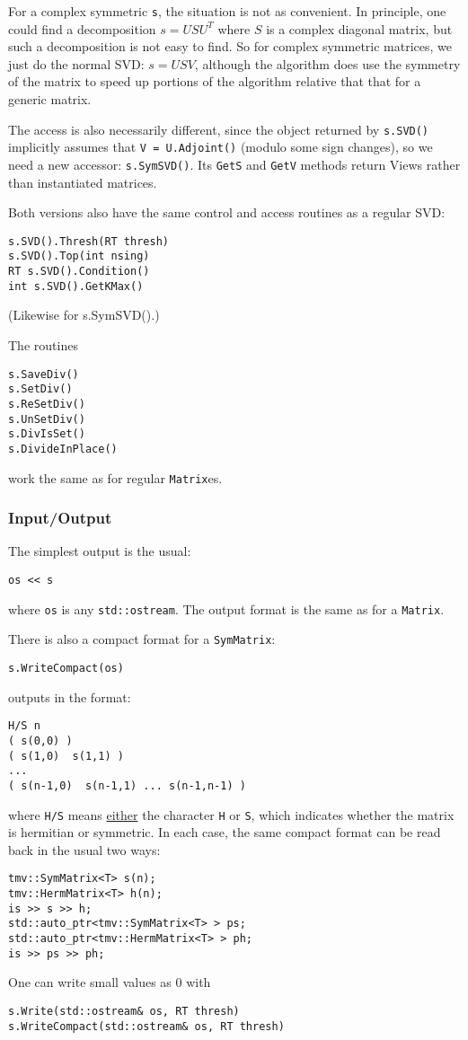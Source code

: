 \documentclass[twoside,letterpaper,11pt]{article}
\renewcommand{\tt}[1]{{\texttt {#1}}}
\begin{document}
\begin{enumerate}
For a complex symmetric \tt{s}, the situation is not as convenient.
In principle, one could find a decomposition $s = USU^T$ where $S$ is 
a complex diagonal matrix, but such a decomposition is not easy to find. 
So for complex symmetric matrices, we
just do the normal SVD: $s = USV$, although the algorithm
does use the symmetry of the matrix to 
speed up portions of the algorithm relative that that for a generic matrix.

The access is also necessarily different, since the object returned by 
\tt{s.SVD()} implicitly assumes that \tt{V = U.Adjoint()} (modulo some sign changes), 
so we need a 
new accessor: \tt{s.SymSVD()}.  Its \tt{GetS} and \tt{GetV} methods return Views
rather than instantiated matrices.

Both versions also have the same control and access routines as a regular SVD:
\begin{verbatim}
s.SVD().Thresh(RT thresh)
s.SVD().Top(int nsing)
RT s.SVD().Condition()
int s.SVD().GetKMax()
\end{verbatim}
(Likewise for s.SymSVD().)

\end{enumerate}
The routines 
\begin{verbatim}
s.SaveDiv()
s.SetDiv()
s.ReSetDiv()
s.UnSetDiv()
s.DivIsSet()
s.DivideInPlace()
\end{verbatim}
work the same as for regular \tt{Matrix}es.

\subsubsection{Input/Output}

The simplest output is the usual:
\begin{verbatim}
os << s
\end{verbatim}
where \tt{os} is any \tt{std::ostream}.
The output format is the same as for a \tt{Matrix}.

There is also a compact format for a \tt{SymMatrix}:
\begin{verbatim}
s.WriteCompact(os)
\end{verbatim}
outputs in the format:
\begin{verbatim}
H/S n 
( s(0,0) )
( s(1,0)  s(1,1) )
...
( s(n-1,0)  s(n-1,1) ... s(n-1,n-1) )
\end{verbatim}
where \tt{H/S} means \underline{either} the character \tt{H} or \tt{S}, which indicates whether 
the matrix is hermitian or symmetric.
In each case, the same compact format can be read back in the usual two ways:
\begin{verbatim}
tmv::SymMatrix<T> s(n);
tmv::HermMatrix<T> h(n);
is >> s >> h;
std::auto_ptr<tmv::SymMatrix<T> > ps;
std::auto_ptr<tmv::HermMatrix<T> > ph;
is >> ps >> ph;
\end{verbatim}
One can write small values as 0 with
\begin{verbatim}
s.Write(std::ostream& os, RT thresh)
s.WriteCompact(std::ostream& os, RT thresh)
\end{verbatim}
\end{document}
